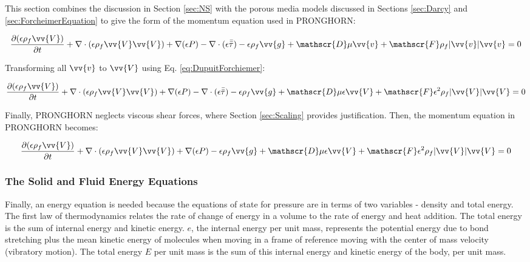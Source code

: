 \documentclass[10pt]{article}
\newcounter{subsubsubsection}[subsubsection]
\numberwithin{equation}{section} %
\begin{document}

This section combines the discussion in Section \ref{sec:NS} with the porous media models discussed in Sections \ref{sec:Darcy} and \ref{sec:ForcheimerEquation} to give the form of the momentum equation used in PRONGHORN:

\begin{equation}
\frac{\partial(\epsilon\rho_f\vv{V})}{\partial t}+\nabla\cdot(\epsilon\rho_f\vv{V}\vv{V})+\nabla (\epsilon P)-\nabla\cdot(\epsilon\bar{\bar\tau})-\epsilon\rho_f\vv{g}+\mathscr{D}\mu\vv{v}+\mathscr{F}\rho_f|\vv{v}|\vv{v}=0
\end{equation}

Transforming all \(\vv{v}\) to \(\vv{V}\) using Eq. \eqref{eq:DupuitForchiemer}:

\begin{equation}
\frac{\partial(\epsilon\rho_f\vv{V})}{\partial t}+\nabla\cdot(\epsilon\rho_f\vv{V}\vv{V})+\nabla (\epsilon P)-\nabla\cdot(\epsilon\bar{\bar\tau})-\epsilon\rho_f\vv{g}+\mathscr{D}\mu\epsilon\vv{V}+\mathscr{F}\epsilon^2\rho_f|\vv{V}|\vv{V}=0
\end{equation}

Finally, PRONGHORN neglects viscous shear forces, where Section \ref{sec:Scaling} provides justification. Then, the momentum equation in PRONGHORN becomes:

\begin{equation}
\label{eq:MomentumPRONGHORN}
\frac{\partial(\epsilon\rho_f\vv{V})}{\partial t}+\nabla\cdot(\epsilon\rho_f\vv{V}\vv{V})+\nabla (\epsilon P)-\epsilon\rho_f\vv{g}+\mathscr{D}\mu\epsilon\vv{V}+\mathscr{F}\epsilon^2\rho_f|\vv{V}|\vv{V}=0
\end{equation}

\subsubsection{The Solid and Fluid Energy Equations}
\label{sec:EnergyEquations}

Finally, an energy equation is needed because the equations of state for pressure are in terms of two variables - density and total energy. The first law of thermodynamics relates the rate of change of energy in a volume to the rate of energy and heat addition. The total energy is the sum of internal energy and kinetic energy. \(e\), the internal energy per unit mass, represents the potential energy due to bond stretching plus the mean kinetic energy of molecules when moving in a frame of reference moving with the center of mass velocity (vibratory motion). The total energy \(E\) per unit mass is the sum of this internal energy and kinetic energy of the body, per unit mass.
\end{document}
